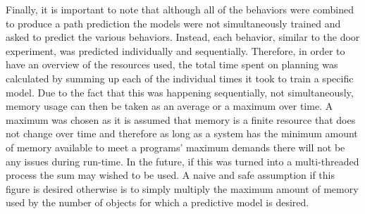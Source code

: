 Finally, it is important to note that although all of the behaviors were
combined to produce a path prediction the models were not simultaneously
trained and asked to predict the various behaviors. Instead, each behavior,
similar to the door experiment, was predicted individually and sequentially.
Therefore, in order to have an overview of the resources used, the total
time spent on planning was calculated by summing up each of the individual
times it took to train a specific model. Due to the fact that this was happening
sequentially, not simultaneously, memory usage can then be taken as an
average or a maximum over time. A maximum was chosen as it is assumed that
memory is a finite resource that does not change over time and therefore as long
as a system has the minimum amount of memory available to meet a programs'
maximum demands there will not be any issues during run-time.
In the future, if this was turned into a multi-threaded process the sum may wished to be used.
A naive and safe assumption if this figure is desired otherwise is to simply
multiply the maximum amount of memory used by the number of objects for which
a predictive model is desired. \\

\begin{table}[htb!]
  \centering
  \caption{Historical Path Planning Results}
\end{table}

